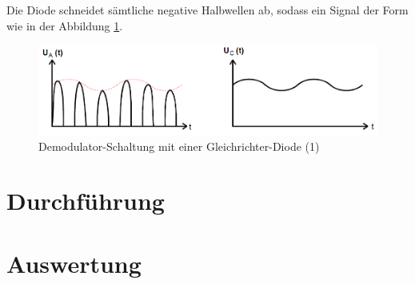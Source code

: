 \documentclass[]{scrartcl}
\begin{document}
Die Diode schneidet sämtliche negative Halbwellen ab, sodass ein Signal der Form wie in der Abbildung \ref{fig:AusgangsspannungDemodulationDiode}.
\begin{figure}[H]
\centering 
\includegraphics[width=14cm]{images/AusgangsspannungDemodulationDiode.png}
\caption{Demodulator-Schaltung mit einer Gleichrichter-Diode (1)}
\label{fig:AusgangsspannungDemodulationDiode}
\end{figure}
\section{Durchführung}

\section{Auswertung}
\end{document}
